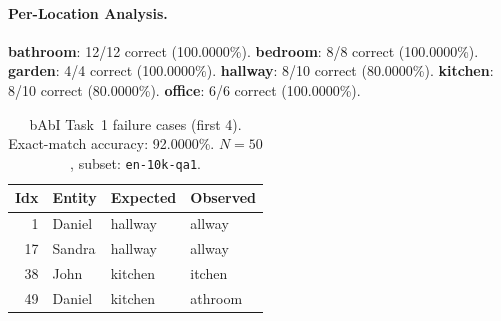 \paragraph{Per-Location Analysis.}
\textbf{bathroom}: 12/12 correct (100.0000\%).
\textbf{bedroom}: 8/8 correct (100.0000\%).
\textbf{garden}: 4/4 correct (100.0000\%).
\textbf{hallway}: 8/10 correct (80.0000\%).
\textbf{kitchen}: 8/10 correct (80.0000\%).
\textbf{office}: 6/6 correct (100.0000\%).
\begin{table}[h]
\centering
\caption{bAbI Task~1 failure cases (first 4).
Exact-match accuracy: 92.0000\%.
$N=50$, subset: \texttt{en-10k-qa1}.}
\label{tab:babi_failures}
\begin{tabular}{|r|l|l|l|}
\hline
\textbf{Idx} & \textbf{Entity} & \textbf{Expected} & \textbf{Observed} \\
\hline
1 & Daniel & hallway & allway \\
\hline
17 & Sandra & hallway & allway \\
\hline
38 & John & kitchen & itchen \\
\hline
49 & Daniel & kitchen & athroom \\
\hline
\end{tabular}
\end{table}
